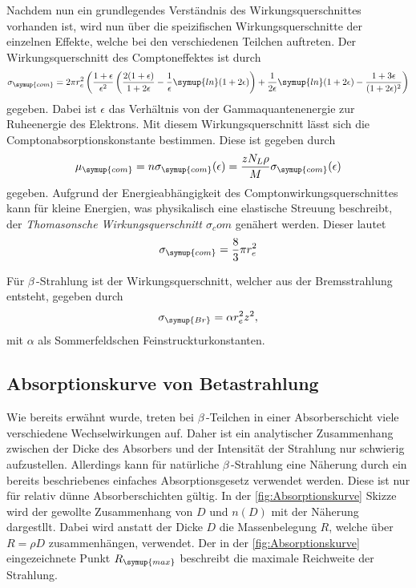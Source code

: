 Nachdem nun ein grundlegendes Verständnis des Wirkungsquerschnittes vorhanden ist, wird nun über die speizifischen Wirkungsquerschnitte der einzelnen Effekte, welche
bei den verschiedenen Teilchen auftreten. 
Der Wirkungsquerschnitt des Comptoneffektes ist durch
\begin{equation}
    \label{eqn:sigma_com}
    \sigma_{\symup{com}} = 2\pi r_{e}^2\left(\frac{1 + \epsilon}{\epsilon^2}\left( \frac{2(1+\epsilon)}{1+2\epsilon} - \frac{1}{\epsilon}\symup{ln}(1+2\epsilon)\right)+\frac{1}{2\epsilon}\symup{ln}(1+2\epsilon) - \frac{1 + 3\epsilon}{(1+2\epsilon)^2}\right)
\end{equation}
gegeben. Dabei ist $\epsilon$ das Verhältnis von der Gammaquantenenergie zur Ruheenergie des Elektrons. Mit diesem Wirkungsquerschnitt lässt sich die Comptonabsorptionskonstante 
bestimmen. Diese ist gegeben durch 
\begin{equation*}
    \mu_{\symup{com}} = n\sigma_{\symup{com}}(\epsilon) = \frac{zN_L\rho}{M}\sigma_{\symup{com}}(\epsilon)
\end{equation*}
gegeben. Aufgrund der Energieabhängigkeit des Comptonwirkungsquerschnittes kann für kleine Energien, was physikalisch eine elastische Streuung beschreibt, der 
\textit{Thomasonsche Wirkungsquerschnitt $\sigma_com$} genähert werden. Dieser lautet 
\begin{equation}
    \sigma_{\symup{com}} = \frac{8}{3}\pi r_e^2
\end{equation}

Für $\beta$\,-Strahlung ist der Wirkungsquerschnitt, welcher aus der Bremsstrahlung entsteht, gegeben durch 
\begin{equation}
    \label{eqn:sigma_br}
    \sigma_{\symup{Br}} = \alpha r_e^2z^2,
\end{equation}
mit $\alpha$ als Sommerfeldschen Feinstruckturkonstanten.

\subsection{Absorptionskurve von Betastrahlung}
\label{subsec:Absorptionskurve}
Wie bereits erwähnt wurde, treten bei $\beta$\,-Teilchen in einer Absorberschicht viele verschiedene Wechselwirkungen auf. Daher ist ein analytischer Zusammenhang zwischen 
der Dicke des Absorbers und der Intensität der Strahlung nur schwierig aufzustellen. Allerdings kann für natürliche  $\beta$\,-Strahlung eine Näherung durch ein bereits 
beschriebenes einfaches Absorptionsgesetz verwendet werden. Diese ist nur für relativ dünne Absorberschichten gültig. In der \autoref{fig:Absorptionskurve} Skizze wird der
gewollte Zusammenhang von $D$ und $n(D)$ mit der Näherung dargestllt. Dabei wird anstatt der Dicke $D$ die Massenbelegung $R$, welche über $R = \rho D$ zusammenhängen, verwendet.
Der in der \autoref{fig:Absorptionskurve} eingezeichnete Punkt $R_{\symup{max}}$ beschreibt die maximale Reichweite der Strahlung.

